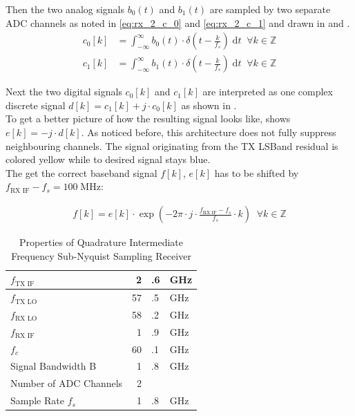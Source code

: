 Then the two analog signals $b_0(t)$ and $b_1(t)$ are sampled by two
separate \gls{ADC} channels as noted in \eqref{eq:rx_2_c_0} and
\eqref{eq:rx_2_c_1} and drawn in 
and . \\

\begin{subequations}
  \begin{alignat}{2}
    c_0[k] &= \int_{-\infty}^{\infty}
    b_0(t) \cdot \delta\left(t - \frac{k}{f_s}\right) \; \text{d}t
    \;\; \forall k \in \mathbb{Z}
    \label{eq:rx_2_c_0} \\
    c_1[k] &= \int_{-\infty}^{\infty}
    b_1(t) \cdot \delta\left(t - \frac{k}{f_s}\right) \; \text{d}t
    \;\; \forall k \in \mathbb{Z}
    \label{eq:rx_2_c_1}
  \end{alignat}
\end{subequations}

Next the two digital signals $c_0[k]$ and $c_1[k]$ are interpreted as one
complex discrete signal $d[k] = c_1[k] + j \cdot c_0[k]$ as shown in
. \\

To get a better picture of how the resulting signal looks like,
 shows $e[k] = -j \cdot d[k]$.
As noticed before, this architecture does not fully suppress neighbouring
channels. The signal originating from the \gls{TX} \gls{LSBand} residual is
colored yellow while to desired signal stays blue. \\

The get the correct baseband signal $f[k]$, $e[k]$ has to be shifted by
$f_{\text{RX IF}} - f_s = 100 \; \text{MHz}$:

\begin{align}
  f[k] = e[k] \cdot \exp\left(-2\pi \cdot j \cdot
  \frac{f_{\text{RX IF}} - f_s}{f_s} \cdot k \right)
  \;\; \forall k \in \mathbb{Z}
\end{align}

\begin{table}[h]
  \centering
  \begin{tabular}{|l|r@{}l@{~}l|}
    \hline
    $f_{\text{TX IF}}$ & 2&.6&GHz \\ \hline
    $f_{\text{TX LO}}$ & 57&.5&GHz \\ \hline
    $f_{\text{RX LO}}$ & 58&.2&GHz \\ \hline
    $f_{\text{RX IF}}$ & 1&.9&GHz \\ \hline
    $f_c$            & 60&.1&GHz \\ \hline
    Signal Bandwidth B & 1&.8&GHz \\ \hline
    Number of \gls{ADC} Channels & 2&& \\ \hline
    Sample Rate $f_s$ & 1&.8&GHz \\ \hline
  \end{tabular}
  \caption{Properties of Quadrature Intermediate Frequency
    Sub-Nyquist Sampling Receiver}
  \label{tab:rx_2}
\end{table}

